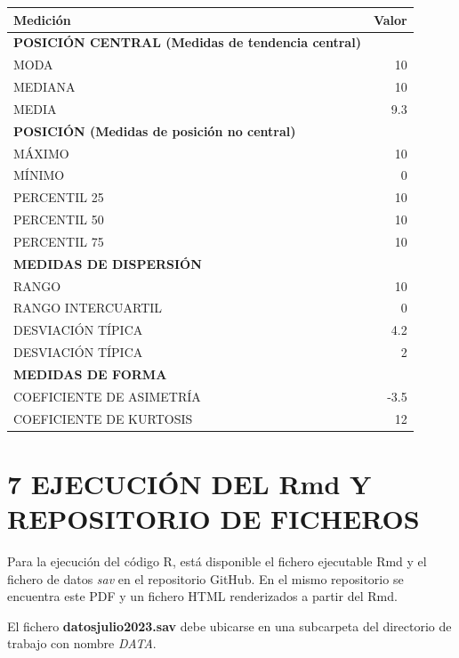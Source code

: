 \documentclass[
  12 pt,
  a4paper,
]{article}
\begin{document}
\begin{longtable}[]{@{}lr@{}}
\toprule\noalign{}
\textbf{Medición} & \textbf{Valor} \\
\midrule\noalign{}
\endhead
\bottomrule\noalign{}
\endlastfoot
\textbf{POSICIÓN CENTRAL (Medidas de tendencia central)} & \\
MODA & 10 \\
MEDIANA & 10 \\
MEDIA & 9.3 \\
\textbf{POSICIÓN (Medidas de posición no central)} & \\
MÁXIMO & 10 \\
MÍNIMO & 0 \\
PERCENTIL 25 & 10 \\
PERCENTIL 50 & 10 \\
PERCENTIL 75 & 10 \\
\textbf{MEDIDAS DE DISPERSIÓN} & \\
RANGO & 10 \\
RANGO INTERCUARTIL & 0 \\
DESVIACIÓN TÍPICA & 4.2 \\
DESVIACIÓN TÍPICA & 2 \\
\textbf{MEDIDAS DE FORMA} & \\
COEFICIENTE DE ASIMETRÍA & -3.5 \\
COEFICIENTE DE KURTOSIS & 12 \\
\end{longtable}

\newpage

\hypertarget{id-github}{%
\section{7 EJECUCIÓN DEL Rmd Y REPOSITORIO DE
FICHEROS}\label{id-github}}

Para la ejecución del código R, está disponible el fichero ejecutable
Rmd y el fichero de datos \emph{sav} en el repositorio GitHub. En el
mismo repositorio se encuentra este PDF y un fichero HTML renderizados a
partir del Rmd.

El fichero \textbf{datosjulio2023.sav} debe ubicarse en una subcarpeta
del directorio de trabajo con nombre \emph{DATA}.
\end{document}
